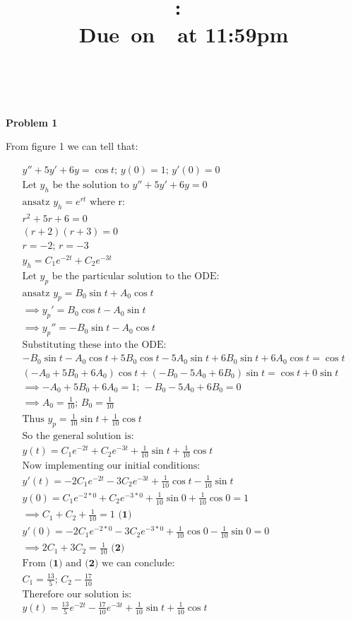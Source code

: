 \documentclass{article}
\title{
    \vspace{2in}
    \textmd{\textbf{\hmwkClass:\ \hmwkTitle}}\\
    \normalsize\vspace{0.1in}\small{Due\ on\ \hmwkDueDate\ at 11:59pm}\\
    \vspace{0.1in}\large{\textit{\hmwkClassInstructor\ \hmwkClassTime}}
    \vspace{3in}
}
\author{\hmwkAuthorName}
\date{}
\begin{document}
\maketitle

\pagebreak

\textbf{Problem 1}

From figure 1 we can tell that: 

\begin{eqnarray*}
y'' + 5y' +6y = \cos{t} \text{; } y(0) = 1 \text{; } y'(0) = 0\\
\text{Let } y_h \text{ be the solution to } y'' + 5y' +6y = 0\\
\text{ansatz } y_h = e^{rt} \text{ where r: }\\
r^2 + 5r + 6 = 0\\
(r+2)(r+3) = 0 \\
r = -2 \text{; } r = -3 \\
y_h = C_1e^{-2t}+C_2e^{-3t}\\
\text{Let } y_p \text{ be the particular solution to the ODE: }\\
\text{ansatz } y_p = B_0\sin{t}+A_0\cos{t}\\
\implies y_p' = B_0\cos{t} -A_0\sin{t}\\
\implies y_p'' = -B_0\sin{t}-A_0\cos{t}\\
\text{Substituting these into the ODE: }\\
-B_0\sin{t}-A_0\cos{t} + 5B_0\cos{t} -5A_0\sin{t} + 6B_0\sin{t}+6A_0\cos{t} = \cos{t}\\
\left(-A_0 + 5B_0+6A_0 \right)\cos{t} + \left(-B_0-5A_0+6B_0\right) \sin{t} = \cos{t} + 0 \sin{t}\\
\implies -A_0 + 5B_0+6A_0 = 1 \text{; } -B_0-5A_0+6B_0 = 0\\
\implies A_0 = \frac{1}{10} \text{; } B_0 = \frac{1}{10}\\
\text{Thus } y_p = \frac{1}{10}\sin{t} + \frac{1}{10}\cos{t}\\
\text{So the general solution is: }\\
y(t) = C_1e^{-2t}+C_2e^{-3t} + \frac{1}{10}\sin{t} + \frac{1}{10}\cos{t}\\
\text{Now implementing our initial conditions: }\\
y'(t) = -2C_1e^{-2t}-3C_2e^{-3t} + \frac{1}{10}\cos{t} - \frac{1}{10}\sin{t}\\
y(0) = C_1e^{-2*0}+C_2e^{-3*0} + \frac{1}{10}\sin{0} + \frac{1}{10}\cos{0} = 1\\
 \implies  C_1 +C_2 +\frac{1}{10} = 1 \textbf{ (1) }\\
y'(0) = -2C_1e^{-2*0}-3C_2e^{-3*0} + \frac{1}{10}\cos{0} - \frac{1}{10}\sin{0} = 0\\
\implies 2C_1 + 3C_2 = \frac{1}{10}\textbf{ (2) }\\
\text{From } \textbf{(1)} \text{ and } \textbf{(2)} \text{ we can conclude: }\\
C_1 = \frac{13}{5} \text{; } C_2 -\frac{17}{10}\\
\text{Therefore our solution is: }\\ 
y(t) = \frac{13}{5}e^{-2t}-\frac{17}{10}e^{-3t}+\frac{1}{10}\sin{t}+\frac{1}{10}\cos{t}
\end{eqnarray*}
\end{document}
